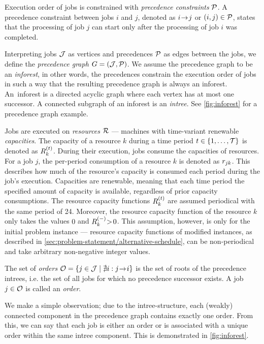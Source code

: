 Execution order of jobs is constrained with \emph{precedence constraints} $\mathcal{P}$.
A precedence constraint between jobs $i$ and $j$,
denoted as $i \hspace{-0.2em} \rightarrow \hspace{-0.2em} j$ or $(i, j) \in \mathcal{P}$,
states that the processing of job $j$ can start only after the processing of job $i$ was completed.

Interpreting jobs $\mathcal{J}$ as vertices and precedences $\mathcal{P}$ as edges between the jobs,
we define the \emph{precedence graph} $G = (\mathcal{J}, \mathcal{P})$.
We assume the precedence graph to be an \emph{inforest}, in other words,
the precedences constrain the execution order of jobs in such a way that the resulting precedence graph
is always an inforest.
An~inforest is a directed acyclic graph where each vertex has at most one successor.
A connected subgraph of an inforest is an \emph{intree}.
See \cref{fig:inforest} for a precedence graph example.

Jobs are executed on \emph{resources} $\mathcal{R}$ --- machines with time-variant renewable \emph{capacities}.
The capacity of a resource $k$ during a time period $t \in \{{1}, \dots, {\mathcal{T}}\}$ is denoted as $\capacity{k}{t}$.
During their execution, jobs consume the capacities of resources.
For a job $j$, the per-period consumption of a resource $k$ is denoted as $r_{j k}$.
This describes how much of the resource's capacity is consumed each period during the job's execution.
Capacities are renewable, meaning that each time period the specified amount of capacity is available,
regardless of prior capacity consumptions.
The resource capacity functions $\capacity{k}{t}$ are assumed periodical with the same period of 24.
Moreover, the resource capacity function of the resource $k$ only takes the values
$0$ and $\shiftcapacity{k} \negmedspace>\! 0$.
This assumption, however, is only for the initial problem instance
--- resource capacity functions of modified instances, as described in \cref{sec:problem-statement/alternative-schedule},
can be non-periodical and take arbitrary non-negative integer values.

The set of \emph{orders} $\mathcal{O} = \{ j \in \mathcal{J} \mid \nexists i : j \hspace{-0.2em} \rightarrow \hspace{-0.2em} i \}$
is the set of roots of the precedence intrees,
i.e. the set of all jobs for which no precedence successor exists.
A job $j \in \mathcal{O}$ is called an \emph{order}.

We make a simple observation; due to the intree-structure,
each (weakly) connected component in the precedence graph contains exactly one order.
From this, we can say that each job is either an order
or is associated with a unique order within the same intree component.
This is demonstrated in \cref{fig:inforest}.

